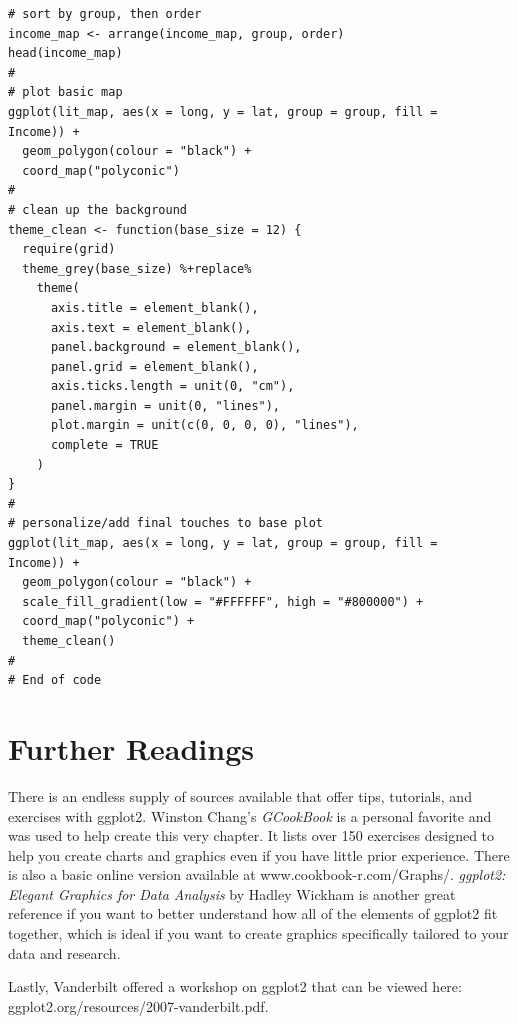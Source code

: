 \begin{lstlisting}
# sort by group, then order
income_map <- arrange(income_map, group, order)
head(income_map)
#
# plot basic map
ggplot(lit_map, aes(x = long, y = lat, group = group, fill =
Income)) + 
  geom_polygon(colour = "black") + 
  coord_map("polyconic")
#
# clean up the background
theme_clean <- function(base_size = 12) {
  require(grid)
  theme_grey(base_size) %+replace%
    theme(
      axis.title = element_blank(),
      axis.text = element_blank(),
      panel.background = element_blank(),
      panel.grid = element_blank(),
      axis.ticks.length = unit(0, "cm"),
      panel.margin = unit(0, "lines"),
      plot.margin = unit(c(0, 0, 0, 0), "lines"),
      complete = TRUE
    )
}
#
# personalize/add final touches to base plot
ggplot(lit_map, aes(x = long, y = lat, group = group, fill =
Income)) + 
  geom_polygon(colour = "black") +
  scale_fill_gradient(low = "#FFFFFF", high = "#800000") +
  coord_map("polyconic") +
  theme_clean()
#
# End of code
\end{lstlisting}


\section{Further Readings}

\indent There is an endless supply of sources available that offer tips, tutorials, and exercises with ggplot2.
Winston Chang's \emph{GCookBook} is a personal favorite and was used to help create this very chapter.
It lists over 150 exercises designed to help you create charts and graphics even if you have little prior experience.
There is also a basic online version available at www.cookbook-r.com/Graphs/. \newline \newline \emph{ggplot2: Elegant Graphics for Data Analysis} by Hadley Wickham is another great reference if you want to better understand how all of the elements of ggplot2 fit together, which is ideal if you want to create graphics specifically tailored to your data and research.
\medskip

\noindent Lastly, Vanderbilt offered a workshop on ggplot2 that can be viewed here: \newline ggplot2.org/resources/2007-vanderbilt.pdf.
